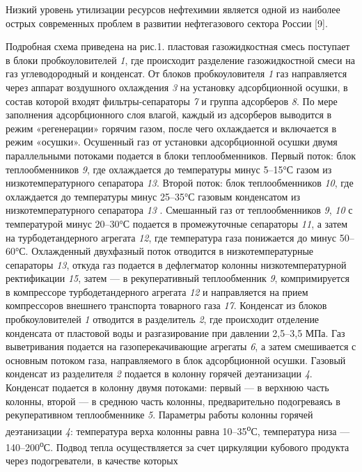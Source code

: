 \begin{multicols}{2}
Низкий уровень утилизации ресурсов нефтехимии является одной из наиболее
острых современных проблем в развитии нефтегазового сектора России
{[}9{]}.

Подробная схема приведена на рис.1. пластовая газожидкостная смесь
поступает в блоки пробкоуловителей \emph{1}, где происходит разделение
газожидкостной смеси на газ углеводородный и конденсат. От блоков
пробкоуловителя \emph{1} газ направляется через аппарат воздушного
охлаждения \emph{3} на установку адсорбционной осушки, в состав которой
входят фильтры-сепараторы \emph{7} и группа адсорберов \emph{8}. По мере
заполнения адсорбционного слоя влагой, каждый из адсорберов выводится в
режим «регенерации» горячим газом, после чего охлаждается и включается в
режим «осушки». Осушенный газ от установки адсорбционной осушки двумя
параллельными потоками подается в блоки теплообменников. Первый поток:
блок теплообменников \emph{9}, где охлаждается до температуры минус
5--15°С газом из низкотемпературного сепаратора \emph{13}. Второй поток:
блок теплообменников \emph{10}, где охлаждается до температуры минус
25--35°С газовым конденсатом из низкотемпературного сепаратора \emph{13}
. Смешанный газ от теплообменников \emph{9}, \emph{10} с температурой
минус 20--30°С подается в промежуточные сепараторы \emph{11}, а затем на
турбодетандерного агрегата \emph{12}, где температура газа понижается до
минус 50--60°С. Охлажденный двухфазный поток отводится в
низкотемпературные сепараторы \emph{13}, откуда газ подается в
дефлегматор колонны низкотемпературной ректификации \emph{15}, затем ---
в рекуперативный теплообменник \emph{9}, компримируется в компрессоре
турбодетандерного агрегата \emph{12} и направляется на прием
компрессоров внешнего транспорта товарного газа \emph{17}. Конденсат из
блоков пробкоуловителей \emph{1} отводится в разделитель \emph{2}, где
происходит отделение конденсата от пластовой воды и разгазирование при
давлении 2,5--3,5 МПа. Газ выветривания подается на газоперекачивающие
агрегаты \emph{6}, а затем смешивается с основным потоком газа,
направляемого в блок адсорбционной осушки. Газовый конденсат из
разделителя \emph{2} подается в колонну горячей деэтанизации \emph{4}.
Конденсат подается в колонну двумя потоками: первый --- в верхнюю часть
колонны, второй --- в среднюю часть колонны, предварительно подогреваясь
в рекуперативном теплообменнике \emph{5}. Параметры работы колонны
горячей деэтанизации \emph{4}: температура верха колонны равна
10--35\textsuperscript{о}С, температура низа
---140--200\textsuperscript{о}С. Подвод тепла осуществляется за счет
циркуляции кубового продукта через подогреватели, в качестве которых

\end{multicols}
